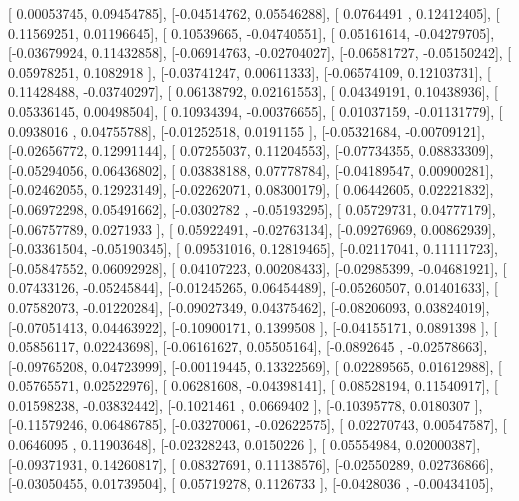 \documentclass{article}
\begin{document}
       [ 0.00053745,  0.09454785],
       [-0.04514762,  0.05546288],
       [ 0.0764491 ,  0.12412405],
       [ 0.11569251,  0.01196645],
       [ 0.10539665, -0.04740551],
       [ 0.05161614, -0.04279705],
       [-0.03679924,  0.11432858],
       [-0.06914763, -0.02704027],
       [-0.06581727, -0.05150242],
       [ 0.05978251,  0.1082918 ],
       [-0.03741247,  0.00611333],
       [-0.06574109,  0.12103731],
       [ 0.11428488, -0.03740297],
       [ 0.06138792,  0.02161553],
       [ 0.04349191,  0.10438936],
       [ 0.05336145,  0.00498504],
       [ 0.10934394, -0.00376655],
       [ 0.01037159, -0.01131779],
       [ 0.0938016 ,  0.04755788],
       [-0.01252518,  0.0191155 ],
       [-0.05321684, -0.00709121],
       [-0.02656772,  0.12991144],
       [ 0.07255037,  0.11204553],
       [-0.07734355,  0.08833309],
       [-0.05294056,  0.06436802],
       [ 0.03838188,  0.07778784],
       [-0.04189547,  0.00900281],
       [-0.02462055,  0.12923149],
       [-0.02262071,  0.08300179],
       [ 0.06442605,  0.02221832],
       [-0.06972298,  0.05491662],
       [-0.0302782 , -0.05193295],
       [ 0.05729731,  0.04777179],
       [-0.06757789,  0.0271933 ],
       [ 0.05922491, -0.02763134],
       [-0.09276969,  0.00862939],
       [-0.03361504, -0.05190345],
       [ 0.09531016,  0.12819465],
       [-0.02117041,  0.11111723],
       [-0.05847552,  0.06092928],
       [ 0.04107223,  0.00208433],
       [-0.02985399, -0.04681921],
       [ 0.07433126, -0.05245844],
       [-0.01245265,  0.06454489],
       [-0.05260507,  0.01401633],
       [ 0.07582073, -0.01220284],
       [-0.09027349,  0.04375462],
       [-0.08206093,  0.03824019],
       [-0.07051413,  0.04463922],
       [-0.10900171,  0.1399508 ],
       [-0.04155171,  0.0891398 ],
       [ 0.05856117,  0.02243698],
       [-0.06161627,  0.05505164],
       [-0.0892645 , -0.02578663],
       [-0.09765208,  0.04723999],
       [-0.00119445,  0.13322569],
       [ 0.02289565,  0.01612988],
       [ 0.05765571,  0.02522976],
       [ 0.06281608, -0.04398141],
       [ 0.08528194,  0.11540917],
       [ 0.01598238, -0.03832442],
       [-0.1021461 ,  0.0669402 ],
       [-0.10395778,  0.0180307 ],
       [-0.11579246,  0.06486785],
       [-0.03270061, -0.02622575],
       [ 0.02270743,  0.00547587],
       [ 0.0646095 ,  0.11903648],
       [-0.02328243,  0.0150226 ],
       [ 0.05554984,  0.02000387],
       [-0.09371931,  0.14260817],
       [ 0.08327691,  0.11138576],
       [-0.02550289,  0.02736866],
       [-0.03050455,  0.01739504],
       [ 0.05719278,  0.1126733 ],
       [-0.0428036 , -0.00434105],
\end{document}
